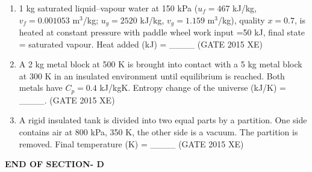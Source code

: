 \documentclass[journal,12pt,onecolumn]{IEEEtran}
\begin{document}
\begin{enumerate}
\item 1 kg saturated liquid–vapour water at 150 kPa ($u_f=467$ kJ/kg, $v_f=0.001053$ m$^3$/kg; $u_g=2520$ kJ/kg, $v_g=1.159$ m$^3$/kg), quality $x=0.7$, is heated at constant pressure with paddle wheel work input =50 kJ, final state = saturated vapour. Heat added (kJ) = \_\_\_\_
\hfill{(GATE 2015 XE)} \\


\item A 2 kg metal block at 500 K is brought into contact with a 5 kg metal block at 300 K in an insulated environment until equilibrium is reached. Both metals have $C_p=0.4$ kJ/kgK. Entropy change of the universe (kJ/K) = \_\_\_\_.
\hfill{(GATE 2015 XE)} \\

\item A rigid insulated tank is divided into two equal parts by a partition. One side contains air at 800 kPa, 350 K, the other side is a vacuum. The partition is removed. Final temperature (K) = \_\_\_\_
\hfill{(GATE 2015 XE)} \\

\end{enumerate}

\vspace{3\baselineskip}
\begin{center}
    \item[\textbf{END OF SECTION- D}]
\end{center}

\newpage
\end{document}
